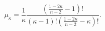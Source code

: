 \begin{equation}
\mu_{\kappa}=\frac{1}{\kappa}\frac{(\frac{1 -2
\kappa}{n-2}-1)!}{(\kappa-1)!(\frac{1 -2 \kappa}{n-2}-\kappa)!}.
\end{equation}

